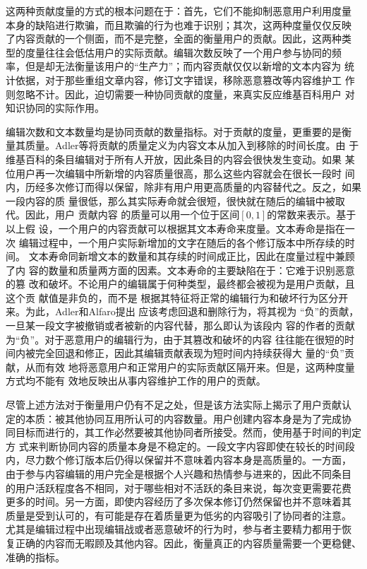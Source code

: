 这两种贡献度量的方式的根本问题在于：首先，它们不能抑制恶意用户利用度量
本身的缺陷进行欺骗，而且欺骗的行为也难于识别；其次，这两种度量仅仅反映
了内容贡献的一个侧面，而不是完整，全面的衡量用户的贡献。因此，这两种类
型的度量往往会低估用户的实际贡献。编辑次数反映了一个用户参与协同的频
率，但是却无法衡量该用户的“生产力”；而内容贡献仅仅以新增的文本内容为
统计依据，对于那些重组文章内容，修订文字错误，移除恶意篡改等内容维护工
作则忽略不计。因此，迫切需要一种协同贡献的度量，来真实反应维基百科用户
对知识协同的实际作用。

编辑次数和文本数量均是协同贡献的数量指标。对于贡献的度量，更重要的是衡
量其质量。Adler等将贡献的质量定义为内容文本从加入到移除的时间长度\cite{Adler2008}。由
于维基百科的条目编辑对于所有人开放，因此条目的内容会很快发生变动。如果
某位用户再一次编辑中所新增的内容质量很高，那么这些内容就会在很长一段时
间内，历经多次修订而得以保留，除非有用户用更高质量的内容替代之。反之，如果一段内容的质
量很低，那么其实际寿命就会很短，很快就在随后的编辑中被取代。因此，用户
贡献内容
的质量可以用一个位于区间$[0,1]$的常数来表示。基于以上假
设，一个用户的内容贡献可以根据其文本寿命来度量。文本寿命是指在一次
编辑过程中，一个用户实际新增加的文字在随后的各个修订版本中所存续的时间。
文本寿命同新增文本的数量和其存续的时间成正比，因此在度量过程中兼顾了内
容的数量和质量两方面的因素。文本寿命的主要缺陷在于：它难于识别恶意的篡
改和破坏。不论用户的编辑属于何种类型，最终都会被视为是用户贡献，且这个贡
献值是非负的，而不是
根据其特征将正常的编辑行为和破坏行为区分开来。为此，Adler和Alfaro提出
应该考虑回退和删除行为，将其视为
“负”的贡献，一旦某一段文字被撤销或者被新的内容代替，那么即认为该段内
容的作者的贡献为“负”\cite{1242608}。对于恶意用户的编辑行为，由于其篡改和破坏的内容
往往能在很短的时间内被完全回退和修正，因此其编辑贡献表现为短时间内持续获得大
量的“负”贡献，从而有效
地将恶意用户和正常用户的实际贡献区隔开来。但是，这两种度量方式均不能有
效地反映出从事内容维护工作的用户的贡献。

尽管上述方法对于衡量用户仍有不足之处，但是该方法实际上揭示了用户贡献认
定的本质：被其他协同互用所认可的内容数量。用户创建内容本身是为了完成协
同目标而进行的，其工作必然要被其他协同者所接受。然而，使用基于时间的判定方
式来判断协同内容的质量本身是不稳定的。一段文字内容即使在较长的时间段
内，尽力数个修订版本后仍得以保留并不意味着内容本身是高质量的。一方面，
由于参与内容编辑的用户完全是根据个人兴趣和热情参与进来的，因此不同条目
的用户活跃程度各不相同，对于哪些相对不活跃的条目来说，每次变更需要花费
更多的时间。另一方面，即使内容经历了多次保本修订仍然保留也并不意味着其
质量是受到认可的，有可能是存在着质量更为低劣的内容吸引了协同者的注意。
尤其是编辑过程中出现编辑战或者恶意破坏的行为时，参与者主要精力都用于恢
复正确的内容而无暇顾及其他内容。因此，衡量真正的内容质量需要一个更稳健、
准确的指标。

